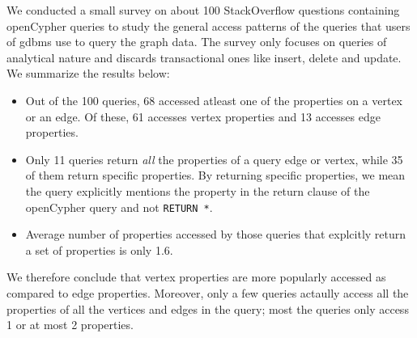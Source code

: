 We conducted a small survey on about 100 StackOverflow questions containing openCypher queries to study the general access patterns of the queries that users of \gls{gdbms} use to query the graph data. The survey only focuses on queries of analytical nature and discards transactional ones like insert, delete and update. We summarize the results below: 

\begin{itemize}
	
	\item Out of the 100 queries, 68 accessed atleast one of the properties on a vertex or an edge. Of these, 61 accesses vertex properties and 13 accesses edge properties.
	
	\item Only 11 queries return \emph{all} the properties of a query edge or vertex, while 35 of them return specific properties. By returning specific properties, we mean the query explicitly mentions the property in the return clause of the openCypher query and not \texttt{{\color{cstm-org}RETURN} *}.
	
	\item Average number of properties accessed by those queries that explcitly return a set of properties is only 1.6.

\end{itemize}

We therefore conclude that vertex properties are more popularly accessed as compared to edge properties. Moreover, only a few queries actaully access all the properties of all the vertices and edges in the query; most the queries only access 1 or at most 2 properties.
